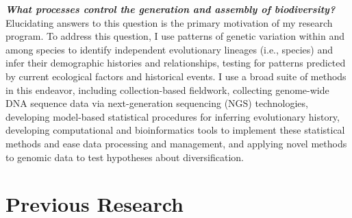\textbf{\textit{What processes control the generation and assembly of
        biodiversity?}}
Elucidating answers to this question is the primary motivation of my research
program.
To address this question, I use patterns of genetic variation within and among
species to identify independent evolutionary lineages (i.e., species) and infer
their demographic histories and relationships, testing for patterns predicted
by current ecological factors and historical events.
I use a broad suite of methods in this endeavor, including
collection-based fieldwork,
collecting genome-wide DNA sequence data via next-generation sequencing (NGS)
technologies,
developing model-based statistical procedures for inferring evolutionary
history,
developing computational and bioinformatics tools to implement these
statistical methods and ease data processing and management,
and applying novel methods to genomic data to test
hypotheses about diversification.

\section*{Previous Research}

